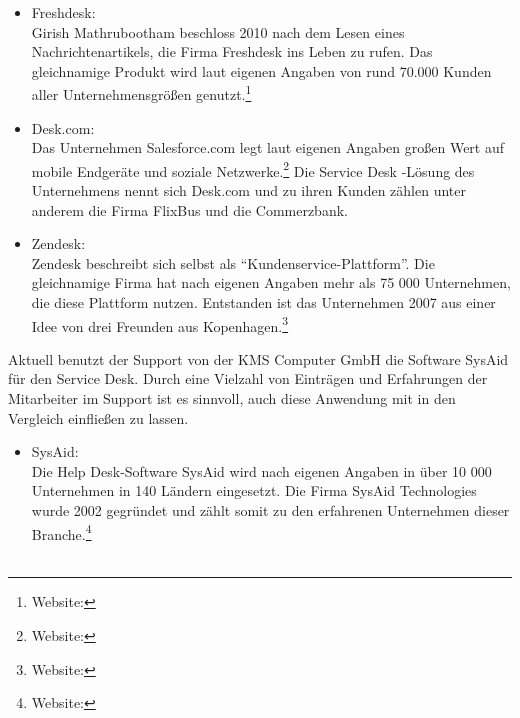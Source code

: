 \begin{itemize}
\item Freshdesk:\\
		Girish Mathrubootham beschloss 2010 nach dem Lesen eines Nachrichtenartikels, die Firma 
		Freshdesk ins Leben zu rufen. Das gleichnamige Produkt wird laut eigenen Angaben von rund 
		70.000 Kunden aller Unternehmensgrößen genutzt.\footnote{Website:\cite{Freshdesk}}
		\\
		 
\item Desk.com:\\
		Das Unternehmen Salesforce.com legt laut eigenen Angaben großen Wert auf mobile 
		Endgeräte und soziale Netzwerke.\footnote{Website:\cite{Salesforce}} Die Service Desk -Lösung 
		des Unternehmens nennt sich Desk.com und zu ihren Kunden zählen unter anderem die Firma 
		FlixBus und die Commerzbank.
		\\
		
\item Zendesk:\\
		Zendesk beschreibt sich selbst als \enquote{Kundenservice-Plattform}. Die gleichnamige 
		Firma hat nach eigenen Angaben mehr als 75 000 Unternehmen, die diese Plattform nutzen. 
		Entstanden ist das Unternehmen 2007 aus einer Idee von drei Freunden aus Kopenhagen.\footnote{Website:\cite{Zendesk}}
		\\		
\end{itemize}

\noindent
Aktuell benutzt der Support von der KMS Computer GmbH die Software SysAid für den Service Desk. Durch eine Vielzahl von Einträgen und Erfahrungen der Mitarbeiter im Support ist es sinnvoll, auch diese Anwendung mit in den Vergleich einfließen zu lassen.

\begin{itemize}
\item SysAid:\\
		 Die Help Desk-Software SysAid wird nach eigenen Angaben in über 10 000 Unternehmen in 
		 140 Ländern eingesetzt. Die Firma SysAid Technologies wurde 2002 gegründet und zählt somit 
		 zu den erfahrenen Unternehmen dieser Branche.\footnote{Website:\cite{SysAid}}
		\\\\
\end{itemize}	

